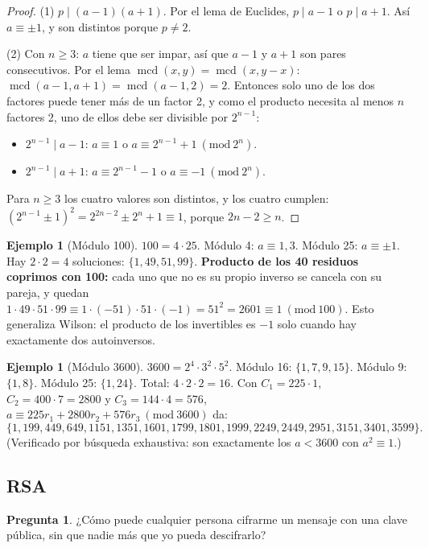 \documentclass[11pt,a4paper]{article}
\theoremstyle{definition}
\newtheorem{ejemplo}[teorema]{Ejemplo}
\newcommand{\md}[1]{\ (\mathrm{mod}\ #1)}
\newcommand{\mcd}{\operatorname{mcd}}
\theoremstyle{notait}
\newtheorem*{pregunta}{Pregunta}
\theoremstyle{nota}
\begin{document}
\begin{proof}
(1) $p\mid(a-1)(a+1)$. Por el lema de Euclides, $p\mid a-1$ o $p\mid a+1$. Así $a\equiv\pm1$, y son distintos porque $p\ne2$.

(2) Con $n\ge3$: $a$ tiene que ser impar, así que $a-1$ y $a+1$ son pares consecutivos. Por el lema $\mcd(x,y)=\mcd(x,y-x)$: $\mcd(a-1,a+1)=\mcd(a-1,2)=2$. Entonces solo uno de los dos factores puede tener más de un factor 2, y como el producto necesita al menos $n$ factores 2, uno de ellos debe ser divisible por $2^{n-1}$:
\begin{itemize}
\item $2^{n-1}\mid a-1$: $a\equiv1$ o $a\equiv2^{n-1}+1\md{2^n}$.
\item $2^{n-1}\mid a+1$: $a\equiv2^{n-1}-1$ o $a\equiv-1\md{2^n}$.
\end{itemize}
Para $n\ge3$ los cuatro valores son distintos, y los cuatro cumplen: $(2^{n-1}\pm1)^2=2^{2n-2}\pm2^n+1\equiv1$, porque $2n-2\ge n$.
\end{proof}

\begin{ejemplo}[Módulo 100]
$100=4\cdot25$. Módulo 4: $a\equiv1,3$. Módulo 25: $a\equiv\pm1$. Hay $2\cdot2=4$ soluciones: $\{1,49,51,99\}$. \textbf{Producto de los 40 residuos coprimos con 100:} cada uno que no es su propio inverso se cancela con su pareja, y quedan $1\cdot49\cdot51\cdot99\equiv1\cdot(-51)\cdot51\cdot(-1)=51^2=2601\equiv1\md{100}$. Esto generaliza Wilson: el producto de los invertibles es $-1$ solo cuando hay exactamente dos autoinversos.
\end{ejemplo}

\begin{ejemplo}[Módulo 3600]
$3600=2^4\cdot3^2\cdot5^2$. Módulo 16: $\{1,7,9,15\}$. Módulo 9: $\{1,8\}$. Módulo 25: $\{1,24\}$. Total: $4\cdot2\cdot2=16$. Con $C_1=225\cdot1$, $C_2=400\cdot7=2800$ y $C_3=144\cdot4=576$, $a\equiv225r_1+2800r_2+576r_3\md{3600}$ da:
\[\{1,199,449,649,1151,1351,1601,1799,1801,1999,2249,2449,2951,3151,3401,3599\}.\]
(Verificado por búsqueda exhaustiva: son exactamente los $a<3600$ con $a^2\equiv1$.)
\end{ejemplo}

\subsection{RSA}

\begin{pregunta}
¿Cómo puede cualquier persona cifrarme un mensaje con una clave pública, sin que nadie más que yo pueda descifrarlo?
\end{pregunta}
\end{document}
